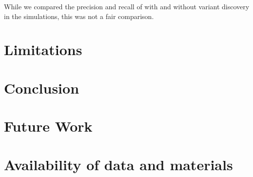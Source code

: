 While we compared the precision and recall of \pandora{} with and without variant discovery in the simulations, this was not a fair comparison. 

\section{Limitations}
\label{sec:denovo-limits}

\section{Conclusion}

\section{Future Work}
\label{sec:denovo-fw}
\section{Availability of data and materials}
